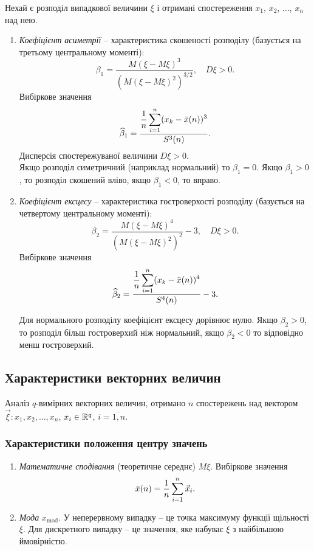 Нехай є розподіл випадкової величини $\xi$ і отримані спостереження $x_1$, $x_2$, $\ldots$, $x_n$ над нею.
\begin{enumerate}
	\item \textit{Коефіцієнт асиметрії} -- характеристика скошеності розподілу (базується на третьому центральному моменті): \[ \beta_1 = \dfrac{M(\xi - M\xi)^3}{(M(\xi - M\xi)^2)^{3/2}}, \quad D\xi > 0. \] Вибіркове значення \[ \widehat{\beta}_1 = \dfrac{\dfrac{1}{n}\displaystyle\sum\limits_{i=1}^n(x_k - \bar{x}(n))^3}{S^3(n)}. \] Дисперсія спостережуваної величини $D\xi > 0$. \\


	Якщо розподіл симетричний (наприклад нормальний) то $\beta_1 =0$. Якщо $\beta_1 > 0$, то розподіл скошений вліво, якщо $\beta_1 < 0$, то вправо.

	\item \textit{Коефіцієнт ексцесу} -- характеристика гостроверхості розподілу (базується на четвертому центральному моменті): \[ \beta_2 = \dfrac{M(\xi-M\xi)^4}{(M(\xi-M\xi)^2)^2} - 3, \quad D\xi > 0. \] Вибіркове значення \[ \widehat{\beta}_2 = \dfrac{\dfrac{1}{n}\displaystyle\sum\limits_{i=1}^n(x_k - \bar{x}(n))^4}{S^4(n)} - 3. \]

	Для нормального розподілу коефіцієнт ексцесу дорівнює нулю. Якщо $\beta_2 > 0$, то розподіл більш гостроверхий ніж нормальний, якщо $\beta_2 < 0$ то відповідно менш гостроверхий.
\end{enumerate}

\subsection{Характеристики векторних величин}

Аналіз $q$-вимірних векторних величин, отримано $n$ спостережень над вектором $\vec\xi: x_1, x_2, \ldots, x_n$, $x_i \in \mathbb{R}^q$, $i = \overline{1,n}$.

\subsubsection{Характеристики положення центру значень}
 
\begin{enumerate}
	\item \textit{Математичне сподівання} (теоретичне середнє) $M\xi$. Вибіркове значення \[\bar{x}(n) = \dfrac{1}{n} \displaystyle\sum\limits_{i=1}^n \vec{x}_i.\]

	\item \textit{Мода} $x_{\text{mod}}$. У неперервному випадку -- це точка максимуму функції щільності $\xi$. Для дискретного випадку -- це значення, яке набуває $\xi$ з найбільшою ймовірністю.
\end{enumerate}

